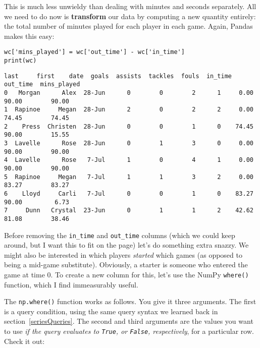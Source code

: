 
This is much less unwieldy than dealing with minutes and seconds separately.
All we need to do now is \textbf{transform} our data by computing a new
quantity entirely: the {total number of minutes played} for each player in each
game. Again, Pandas makes this easy:

\begin{Verbatim}[fontsize=\small,samepage=true,frame=single,framesep=3mm]
wc['mins_played'] = wc['out_time'] - wc['in_time']
print(wc)
\end{Verbatim}
\vspace{-.2in}

\begin{Verbatim}[fontsize=\scriptsize,samepage=true,frame=leftline,framesep=5mm,framerule=1mm]
      last     first    date  goals  assists  tackles  fouls  in_time  out_time  mins_played
0   Morgan      Alex  28-Jun      0        0        2      1     0.00     90.00        90.00
1  Rapinoe     Megan  28-Jun      2        0        2      2     0.00     74.45        74.45
2    Press  Christen  28-Jun      0        0        1      0    74.45     90.00        15.55
3  Lavelle      Rose  28-Jun      0        1        3      0     0.00     90.00        90.00
4  Lavelle      Rose   7-Jul      1        0        4      1     0.00     90.00        90.00
5  Rapinoe     Megan   7-Jul      1        1        3      2     0.00     83.27        83.27
6    Lloyd     Carli   7-Jul      0        0        1      0    83.27     90.00         6.73
7     Dunn   Crystal  23-Jun      0        1        1      2    42.62     81.08        38.46
\end{Verbatim}


Before removing the \texttt{in\_time} and \texttt{out\_time} columns (which we
could keep around, but I want this to fit on the page) let's do something extra
snazzy. We might also be interested in which players \textit{started} which
games (as opposed to being a mid-game substitute). Obviously, a starter is
someone who entered the game at time 0. To create a new column for this, let's
use the NumPy \texttt{where()} function, which I find immeasurably useful.

The \texttt{np.where()} function works as follows. You give it three arguments.
The first is a query condition, using the same query syntax we learned back in
section~\ref{seriesQueries}. The second and third arguments are the values you
want to use \textit{if the query evaluates to \texttt{True}, or \texttt{False},
respectively}, for a particular row. Check it out:

